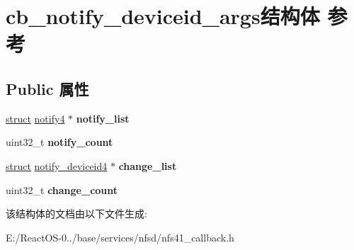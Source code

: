 \hypertarget{structcb__notify__deviceid__args}{}\section{cb\+\_\+notify\+\_\+deviceid\+\_\+args结构体 参考}
\label{structcb__notify__deviceid__args}
\subsection*{Public 属性}
\begin{DoxyCompactItemize}
\item 
\mbox{\label{structcb__notify__deviceid__args_afba1d38ccc365b71b0d51590e5928110}} 
\hyperlink{interfacestruct}{struct} \hyperlink{structnotify4}{notify4} $\ast$ {\bfseries notify\+\_\+list}
\item 
\mbox{\label{structcb__notify__deviceid__args_afc580a09ba0136951fc284b26fcf52e6}} 
uint32\+\_\+t {\bfseries notify\+\_\+count}
\item 
\mbox{\label{structcb__notify__deviceid__args_a92f6c5c5546d10804028d69382f66634}} 
\hyperlink{interfacestruct}{struct} \hyperlink{structnotify__deviceid4}{notify\+\_\+deviceid4} $\ast$ {\bfseries change\+\_\+list}
\item 
\mbox{\label{structcb__notify__deviceid__args_a91c7f7ef6052678063bbfa13b2ed3d41}} 
uint32\+\_\+t {\bfseries change\+\_\+count}
\end{DoxyCompactItemize}


该结构体的文档由以下文件生成\+:\begin{DoxyCompactItemize}
\item 
E\+:/\+React\+O\+S-\/0../base/services/nfsd/nfs41\+\_\+callback.\+h\end{DoxyCompactItemize}
